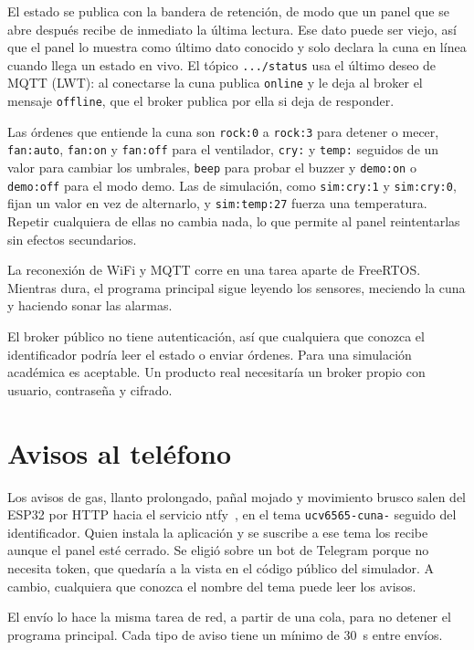 El estado se publica con la bandera de retención, de modo que un panel que se abre
después recibe de inmediato la última lectura. Ese dato puede ser viejo, así que el panel
lo muestra como último dato conocido y solo declara la cuna en línea cuando llega un
estado en vivo. El tópico \texttt{.../status} usa el último deseo de MQTT (LWT): al
conectarse la cuna publica \texttt{online} y le deja al broker el mensaje
\texttt{offline}, que el broker publica por ella si deja de responder.

Las órdenes que entiende la cuna son \texttt{rock:0} a \texttt{rock:3} para detener o
mecer, \texttt{fan:auto}, \texttt{fan:on} y \texttt{fan:off} para el ventilador,
\texttt{cry:} y \texttt{temp:} seguidos de un valor para cambiar los umbrales,
\texttt{beep} para probar el buzzer y \texttt{demo:on} o \texttt{demo:off} para el modo
demo. Las de simulación, como \texttt{sim:cry:1} y \texttt{sim:cry:0}, fijan un valor en
vez de alternarlo, y \texttt{sim:temp:27} fuerza una temperatura. Repetir cualquiera de
ellas no cambia nada, lo que permite al panel reintentarlas sin efectos secundarios.

La reconexión de WiFi y MQTT corre en una tarea aparte de FreeRTOS. Mientras dura, el
programa principal sigue leyendo los sensores, meciendo la cuna y haciendo sonar las
alarmas.

El broker público no tiene autenticación, así que cualquiera que conozca el
identificador podría leer el estado o enviar órdenes. Para una simulación académica es
aceptable. Un producto real necesitaría un broker propio con usuario, contraseña y
cifrado.

\section{Avisos al teléfono}

Los avisos de gas, llanto prolongado, pañal mojado y movimiento brusco salen del ESP32
por HTTP hacia el servicio ntfy~\cite{ntfy}, en el tema
\texttt{ucv6565-cuna-} seguido del identificador. Quien instala la aplicación y se
suscribe a ese tema los recibe aunque el panel esté cerrado. Se eligió sobre un bot de
Telegram porque no necesita token, que quedaría a la vista en el código público del
simulador. A cambio, cualquiera que conozca el nombre del tema puede leer los avisos.

El envío lo hace la misma tarea de red, a partir de una cola, para no detener el programa
principal. Cada tipo de aviso tiene un mínimo de 30~s entre envíos.

